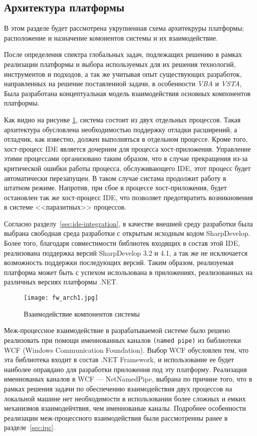 \subsection{Архитектура платформы}

В этом разделе будет рассмотрена укрупненная схема архитекруры платформы; расположение и назначение комонентов системы и их взаимодействие.

После определения спектра глобальных задач, подлежащих решению в рамках реализации платформы и выбора используемых для их решения технологий, инструментов и подходов, а так же учитывая опыт существующих разработок, направленных на решение поставленной задачи, в особенности {\it VBA} и {\it VSTA}, Была разработана концептуальная модель взаимодействия основных компонентов платформы.

Как видно на рисунке \ref{fw_arch1}, система состоит из двух отдельных процессов. Такая архитектура обусловлена необходимостью поддержку отладки расширений, а отладчик, как известно, должен выполняться в отдельном процессе. Кроме того, хост-процесс IDE является дочерним для процесса хост-приложения. Управление этими процессами организовано таким образом, что в случае прекращения из-за критической ошибки работы процесса, обслуживающего IDE, этот процесс будет автоматически перезапущен. В таком случае систама продолжит работу в штатном режиме. Напротив, при сбое в процессе хост-приложения, будет остановлен так же хост-процесс IDE, что позволяет предотвратить возникновения в системе <<паразитных>> процессов.

Согласно разделу~\ref{sec:ide-integration}, в качестве внешней среду разработки была выбрана свободная среда разработки с открытым исходным кодом SharpDevelop. Более того, благодаря совместимости библиотек входящих в состав этой IDE, реализована поддержка версий SharpDevelop 3.2 и 4.1, а так же не исключается возможность поддержки последующих версий. Таким образом, реализуемая платформа может быть с успехом ислользована в приложениях, реализованных на различных версиях платформы .NET.

\begin{figure}[!h]
    \centering
    \texttt{[image: fw\_arch1.jpg]}
    \caption{Взаимодействие компонентов системы}
    \label{fw_arch1}
\end{figure}

Меж-процессное взаимодействие в разрабатываемой системе было решено реализовать при помощи именнованных каналов {\tt (named pipe)} из библиотеки WCF (Windows Communication Foundation). Выбор WCF обусловлен тем, что эта библиотека входит в состав .NET Framework, и использование ее будет наиболее оправдано для разработки приложения под эту платформу. Реализация именнованых каналов в WCF --- NetNamedPipe, выбрана по причине того, что в рамках решения задачи по обеспечению взаимодействия двух процессов на локальной машине нет необходимости в использовании более сложных и емких механизмов взаимодейчтвия, чем именнованые каналы. Подробнее особенности реализации меж-процессного взаимодействия были рассмотренны ранее в разделе~\ref{sec:ipc}.

